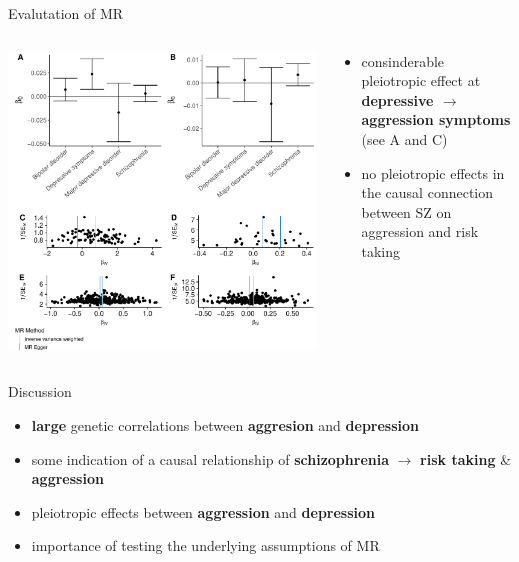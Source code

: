 \documentclass{beamer}
\begin{document}
\begin{frame}[t]{Evalutation of MR}
  \tiny
  \begin{columns}[T]
    \begin{column}[T]{0.6\textwidth}
      \includegraphics[width=0.99\linewidth]{../ukb_psychiatric/figures/sensitvity_plot.pdf}
    \end{column}
    \begin{column}[T]{0.4\textwidth}
      \begin{itemize}
        \item consinderable pleiotropic effect at \textbf{depressive $\rightarrow$ aggression symptoms} (see A and C)
        \item no pleiotropic effects in the causal connection between SZ on aggression and risk taking 
      \end{itemize}
    \end{column}
  \end{columns}
\end{frame}

\begin{frame}[t]{Discussion}
  \begin{itemize}
    \item \textbf{large} genetic correlations between \textbf{aggresion} and \textbf{depression}
    \item some indication of a causal relationship of \textbf{schizophrenia} $\rightarrow$ \textbf{risk taking} \& \textbf{aggression}
    \item pleiotropic effects between \textbf{aggression} and \textbf{depression} 
    \item importance of testing the underlying assumptions of MR
  \end{itemize} 
\end{frame}
\end{document}
